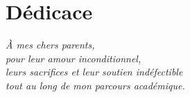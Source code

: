 
\chapter*{Dédicace}
\thispagestyle{empty}

\vspace*{3cm}

\begin{flushright}
\begin{minipage}{0.6\textwidth}
\itshape

\textit{À mes chers parents,}\\[0.5cm]
\textit{pour leur amour inconditionnel,}\\
\textit{leurs sacrifices et leur soutien indéfectible}\\
\textit{tout au long de mon parcours académique.}\\[1cm]

\end{minipage}
\end{flushright}
